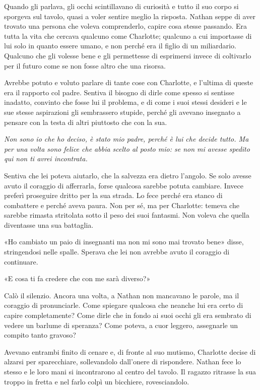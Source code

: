 \documentclass[a4paper,oneside,10pt]{memoir}
\begin{document}
Quando gli parlava, gli occhi scintillavano di curiosità e tutto il suo corpo si sporgeva sul tavolo, quasi a voler
sentire meglio la risposta. Nathan seppe di aver trovato una persona che voleva comprenderlo, capire cosa stesse
passando. Era tutta la vita che cercava qualcuno come Charlotte; qualcuno a cui importasse di lui solo in quanto essere
umano, e non perché era il figlio di un miliardario. Qualcuno che gli volesse bene e gli permettesse di esprimersi
invece di coltivarlo per il futuro come se non fosse altro che una risorsa.

Avrebbe potuto e voluto parlare di tante cose con Charlotte, e l'ultima di queste era il rapporto col padre. Sentiva il
bisogno di dirle come spesso si sentisse inadatto, convinto che fosse lui il problema, e di come i suoi stessi desideri
e le sue stesse aspirazioni gli sembrassero stupide, perché gli avevano insegnato a pensare con la testa di altri
piuttosto che con la sua.

\emph{Non sono io che ho deciso, è stato mio padre, perché è lui che decide tutto. Ma per una volta sono felice che
abbia scelto al posto mio: se non mi avesse spedito qui non ti avrei incontrata.}

Sentiva che lei poteva aiutarlo, che la salvezza era dietro l'angolo. Se solo avesse avuto il coraggio di afferrarla,
forse qualcosa sarebbe potuta cambiare. Invece preferì proseguire dritto per la sua strada. Lo fece perché era stanco
di combattere e perché aveva paura. Non per sé, ma per Charlotte: temeva che sarebbe rimasta stritolata sotto il peso
dei suoi fantasmi. Non voleva che quella diventasse una sua battaglia.

«Ho cambiato un paio di insegnanti ma non mi sono mai trovato bene» disse, stringendosi nelle spalle. Sperava che lei
non avrebbe avuto il coraggio di continuare.

«E cosa ti fa credere che con me sarà diverso?»

Calò il silenzio. Ancora una volta, a Nathan non mancavano le parole, ma il coraggio di pronunciarle. Come spiegare
qualcosa che neanche lui era certo di capire completamente? Come dirle che in fondo ai suoi occhi gli era sembrato di
vedere un barlume di speranza? Come poteva, a cuor leggero, assegnarle un compito tanto gravoso?

Avevano entrambi finito di cenare e, di fronte al suo mutismo, Charlotte decise di alzarsi per sparecchiare,
sollevandolo dall'onere di rispondere. Nathan fece lo stesso e le loro mani si incontrarono al centro del tavolo. Il
ragazzo ritrasse la sua troppo in fretta e nel farlo colpì un bicchiere, rovesciandolo.
\end{document}
